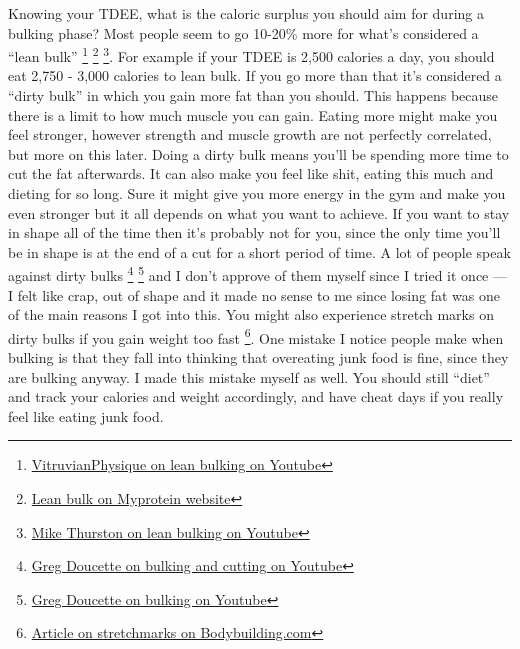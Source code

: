 \documentclass[openany, 12pt]{book}
\begin{document}
	Knowing your TDEE, what is the caloric surplus you should aim for during a bulking phase? Most people seem to go 10-20\% more for what's considered a ``lean bulk''
        \footnote{\href{https://www.youtube.com/watch?v=rCdba0UPTMk}{VitruvianPhysique on lean bulking on Youtube}}
        \footnote{\href{https://us.myprotein.com/thezone/nutrition/the-lean-bulk-how-to-minimize-fat-gain-while-bulking/}{Lean bulk on Myprotein website}}
        \footnote{\href{https://www.youtube.com/watch?v=Ci3qXtNFU_w}{Mike Thurston on lean bulking on Youtube}}.
        For example if your TDEE is 2,500 calories a day, you should eat 2,750 - 3,000 calories to lean bulk. If you go more than that it's considered a ``dirty bulk'' in which you gain more fat than
        you should. This happens because there is a limit to how much muscle you can gain. Eating more might make you feel stronger, however strength and muscle growth are not perfectly correlated,
        but more on this later. Doing a dirty bulk means you'll be spending more time to cut the fat afterwards. It can also make you feel like shit, eating this much and dieting for so long.
        Sure it might give you more energy in the gym and make you even stronger but it all depends on what you want to achieve. If you want to stay in shape all of the time then it's probably not for you,
        since the only time you'll be in shape is at the end of a cut for a short period of time. A lot of people speak against dirty bulks
        \footnote{\href{https://www.youtube.com/watch?v=DjEnkzhz5T4}{Greg Doucette on bulking and cutting on Youtube}}
        \footnote{\href{https://www.youtube.com/watch?v=xl0ZNFcvuJI}{Greg Doucette on bulking on Youtube}} and I don't approve of them myself since I tried it once --- I felt like crap, out of shape and
        it made no sense to me since losing fat was one of the main reasons I got into this. You might also experience stretch marks on dirty bulks if you gain weight too fast
        \footnote{\href{https://www.bodybuilding.com/content/stretchmark-maintenance.html}{Article on stretchmarks on Bodybuilding.com}}. One mistake I notice people make when bulking is that they
        fall into thinking that overeating junk food is fine, since they are bulking anyway. I made this mistake myself as well. You should still ``diet'' and track your calories and weight accordingly,
        and have cheat days if you really feel like eating junk food.
	
\end{document}
